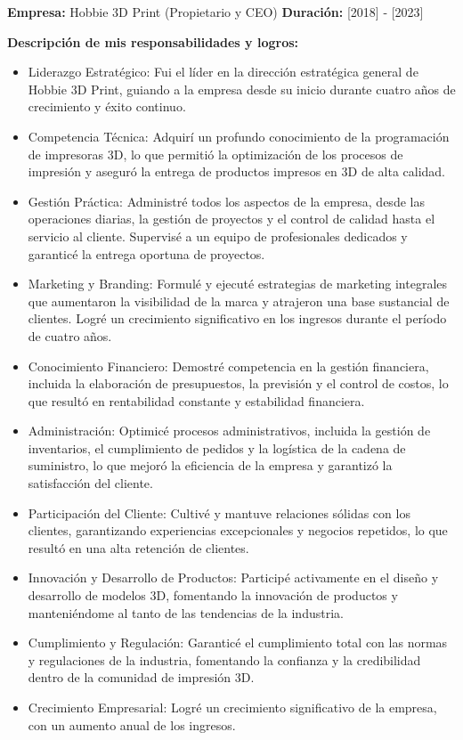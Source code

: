 \documentclass[a4paper,10pt]{article}
\begin{document}
\textbf{Empresa:} Hobbie 3D Print (Propietario y CEO)  
\textbf{Duración:} [2018] - [2023]

\textbf{Descripción de mis responsabilidades y logros:}
\begin{itemize}
    \item Liderazgo Estratégico: Fui el líder en la dirección estratégica general de Hobbie 3D Print, guiando a la empresa desde su inicio durante cuatro años de crecimiento y éxito continuo.
    \item Competencia Técnica: Adquirí un profundo conocimiento de la programación de impresoras 3D, lo que permitió la optimización de los procesos de impresión y aseguró la entrega de productos impresos en 3D de alta calidad.
    \item Gestión Práctica: Administré todos los aspectos de la empresa, desde las operaciones diarias, la gestión de proyectos y el control de calidad hasta el servicio al cliente. Supervisé a un equipo de profesionales dedicados y garanticé la entrega oportuna de proyectos.
    \item Marketing y Branding: Formulé y ejecuté estrategias de marketing integrales que aumentaron la visibilidad de la marca y atrajeron una base sustancial de clientes. Logré un crecimiento significativo en los ingresos durante el período de cuatro años.
    \item Conocimiento Financiero: Demostré competencia en la gestión financiera, incluida la elaboración de presupuestos, la previsión y el control de costos, lo que resultó en rentabilidad constante y estabilidad financiera.
    \item Administración: Optimicé procesos administrativos, incluida la gestión de inventarios, el cumplimiento de pedidos y la logística de la cadena de suministro, lo que mejoró la eficiencia de la empresa y garantizó la satisfacción del cliente.
    \item Participación del Cliente: Cultivé y mantuve relaciones sólidas con los clientes, garantizando experiencias excepcionales y negocios repetidos, lo que resultó en una alta retención de clientes.
    \item Innovación y Desarrollo de Productos: Participé activamente en el diseño y desarrollo de modelos 3D, fomentando la innovación de productos y manteniéndome al tanto de las tendencias de la industria.
    \item Cumplimiento y Regulación: Garanticé el cumplimiento total con las normas y regulaciones de la industria, fomentando la confianza y la credibilidad dentro de la comunidad de impresión 3D.
    \item Crecimiento Empresarial: Logré un crecimiento significativo de la empresa, con un aumento anual de los ingresos.
\end{itemize}
\end{document}
